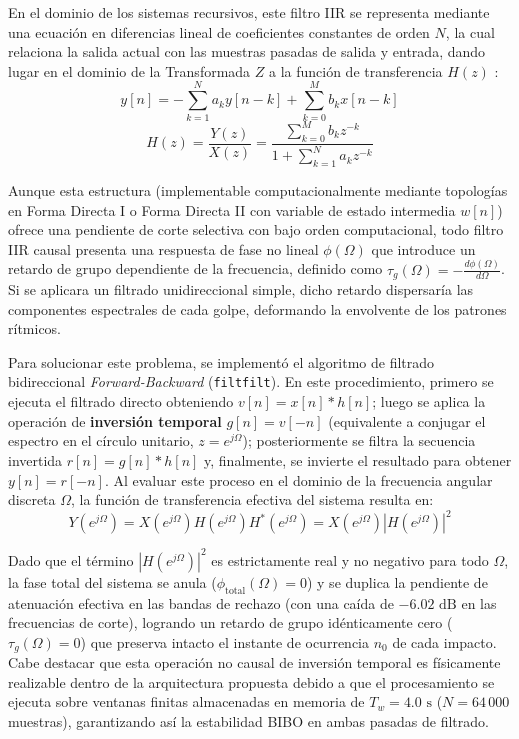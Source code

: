 \documentclass[11pt, a4paper]{article}
\begin{document}
En el dominio de los sistemas recursivos, este filtro IIR se representa mediante una ecuación en diferencias lineal de coeficientes constantes de orden $N$, la cual relaciona la salida actual con las muestras pasadas de salida y entrada, dando lugar en el dominio de la Transformada $Z$ a la función de transferencia $H(z)$ \cite{Proakis}:
\begin{equation}
    y[n] = -\sum_{k=1}^{N} a_k y[n - k] + \sum_{k=0}^{M} b_k x[n - k] 
\end{equation}
\begin{equation}
    H(z) = \frac{Y(z)}{X(z)} = \frac{\sum_{k=0}^{M} b_k z^{-k}}{1 + \sum_{k=1}^{N} a_k z^{-k}}
\end{equation}

Aunque esta estructura (implementable computacionalmente mediante topologías en Forma Directa I o Forma Directa II con variable de estado intermedia $w[n]$) ofrece una pendiente de corte selectiva con bajo orden computacional, todo filtro IIR causal presenta una respuesta de fase no lineal $\phi(\Omega)$ que introduce un retardo de grupo dependiente de la frecuencia, definido como $\tau_g(\Omega) = -\frac{d\phi(\Omega)}{d\Omega}$. Si se aplicara un filtrado unidireccional simple, dicho retardo dispersaría las componentes espectrales de cada golpe, deformando la envolvente de los patrones rítmicos.

Para solucionar este problema, se implementó el algoritmo de filtrado bidireccional \textit{Forward-Backward} (\texttt{filtfilt}). En este procedimiento, primero se ejecuta el filtrado directo obteniendo $v[n] = x[n] * h[n]$; luego se aplica la operación de \textbf{inversión temporal} $g[n] = v[-n]$ (equivalente a conjugar el espectro en el círculo unitario, $z = e^{j\Omega}$); posteriormente se filtra la secuencia invertida $r[n] = g[n] * h[n]$ y, finalmente, se invierte el resultado para obtener $y[n] = r[-n]$. Al evaluar este proceso en el dominio de la frecuencia angular discreta $\Omega$, la función de transferencia efectiva del sistema resulta en:
\begin{equation}
    Y(e^{j\Omega}) = X(e^{j\Omega}) H(e^{j\Omega}) H^*(e^{j\Omega}) = X(e^{j\Omega}) |H(e^{j\Omega})|^2
\end{equation}

Dado que el término $|H(e^{j\Omega})|^2$ es estrictamente real y no negativo para todo $\Omega$, la fase total del sistema se anula ($\phi_{\text{total}}(\Omega) = 0$) y se duplica la pendiente de atenuación efectiva en las bandas de rechazo (con una caída de $-6.02\text{ dB}$ en las frecuencias de corte), logrando un retardo de grupo idénticamente cero ($\tau_g(\Omega) = 0$) que preserva intacto el instante de ocurrencia $n_0$ de cada impacto. Cabe destacar que esta operación no causal de inversión temporal es físicamente realizable dentro de la arquitectura propuesta debido a que el procesamiento se ejecuta sobre ventanas finitas almacenadas en memoria de $T_w = 4.0\text{ s}$ ($N = 64\,000$ muestras), garantizando así la estabilidad BIBO en ambas pasadas de filtrado.
\end{document}
